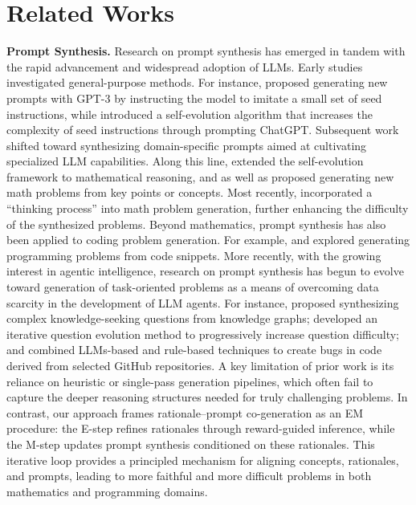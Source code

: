   \section{Related Works}
  \textbf{Prompt Synthesis.} Research on prompt synthesis has emerged in tandem with the rapid advancement and widespread adoption of LLMs. Early studies investigated general-purpose methods. For instance, \citet{wang2023self} proposed generating new prompts with GPT-3 by instructing the model to imitate a small set of seed instructions, while \citet{xu2024wizardlm} introduced a self-evolution algorithm that increases the complexity of seed instructions through prompting ChatGPT. Subsequent work shifted toward synthesizing domain-specific prompts aimed at cultivating specialized LLM capabilities. Along this line, \citet{luo2023wizardmath} extended the self-evolution framework to mathematical reasoning, and \citet{huang2025key} as well as \citet{tang2024mathscale} proposed generating new math problems from key points or concepts. Most recently, \citet{zhao2025promptcot} incorporated a ``thinking process'' into math problem generation, further enhancing the difficulty of the synthesized problems. Beyond mathematics, prompt synthesis has also been applied to coding problem generation. For example, \citet{huang2024opencoder} and \citet{wei2023magicoder} explored generating programming problems from code snippets. More recently, with the growing interest in agentic intelligence, research on prompt synthesis has begun to evolve toward generation of task-oriented problems as a means of overcoming data scarcity in the development of LLM agents. For instance, \citet{li2025websailor} proposed synthesizing complex knowledge-seeking questions from knowledge graphs; \citet{liu2025webexplorer} developed an iterative question evolution method to progressively increase question difficulty; and \citet{yang2025swe} combined LLMs-based and rule-based techniques to create bugs in code derived from selected GitHub repositories.
  A key limitation of prior work is its reliance on heuristic or single-pass generation pipelines, which often fail to capture the deeper reasoning structures needed for truly challenging problems.  
  In contrast, our approach frames rationale–prompt co-generation as an EM procedure: the E-step refines rationales through reward-guided inference, while the M-step updates prompt synthesis conditioned on these rationales.  
  This iterative loop provides a principled mechanism for aligning concepts, rationales, and prompts, leading to more faithful and more difficult problems in both mathematics and programming domains.
  
